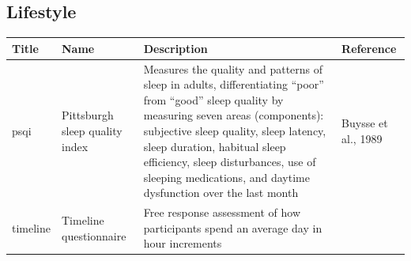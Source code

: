 \documentclass[]{book}
\begin{document}
\hypertarget{lifestyle}{%
\subsection{Lifestyle}\label{lifestyle}}

\begin{longtable}[]{@{}llll@{}}
\toprule
\begin{minipage}[b]{0.22\columnwidth}\raggedright
Title\strut
\end{minipage} & \begin{minipage}[b]{0.27\columnwidth}\raggedright
Name\strut
\end{minipage} & \begin{minipage}[b]{0.22\columnwidth}\raggedright
Description\strut
\end{minipage} & \begin{minipage}[b]{0.18\columnwidth}\raggedright
Reference\strut
\end{minipage}\tabularnewline
\midrule
\endhead
\begin{minipage}[t]{0.22\columnwidth}\raggedright
psqi\strut
\end{minipage} & \begin{minipage}[t]{0.27\columnwidth}\raggedright
Pittsburgh sleep quality index\strut
\end{minipage} & \begin{minipage}[t]{0.22\columnwidth}\raggedright
Measures the quality and patterns of sleep in adults, differentiating ``poor'' from ``good'' sleep quality by measuring seven areas (components): subjective sleep quality, sleep latency, sleep duration, habitual sleep efficiency, sleep disturbances, use of sleeping medications, and daytime dysfunction over the last month\strut
\end{minipage} & \begin{minipage}[t]{0.18\columnwidth}\raggedright
Buysse et al., 1989\strut
\end{minipage}\tabularnewline
\begin{minipage}[t]{0.22\columnwidth}\raggedright
timeline\strut
\end{minipage} & \begin{minipage}[t]{0.27\columnwidth}\raggedright
Timeline questionnaire\strut
\end{minipage} & \begin{minipage}[t]{0.22\columnwidth}\raggedright
Free response assessment of how participants spend an average day in hour increments\strut
\end{minipage} & \begin{minipage}[t]{0.18\columnwidth}\raggedright

\end{minipage}
\end{longtable}
\end{document}
